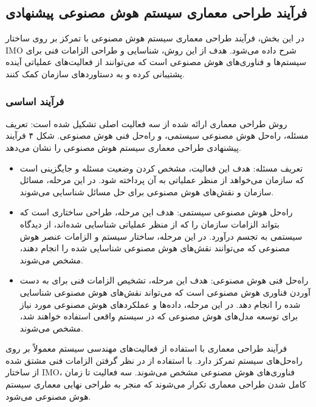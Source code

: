 \documentclass[a4paper,10pt]{article}
\begin{document}
        \subsection{فرآیند طراحی معماری سیستم هوش مصنوعی پیشنهادی}

            در این بخش، فرآیند طراحی معماری سیستم هوش مصنوعی با تمرکز بر روی ساختار IMO شرح داده می‌شود. هدف از این روش، شناسایی و طراحی الزامات فنی برای سیستم‌ها و فناوری‌های هوش مصنوعی است که می‌توانند از فعالیت‌های عملیاتی آینده پشتیبانی کرده و به دستاوردهای سازمان کمک کنند.

            \subsubsection{فرآیند اساسی}

                روش طراحی معماری ارائه شده از سه فعالیت اصلی تشکیل شده است: تعریف مسئله، راه‌حل هوش مصنوعی سیستمی، و راه‌حل فنی هوش مصنوعی. شکل ۴ فرآیند پیشنهادی طراحی معماری سیستم هوش مصنوعی را نشان می‌دهد.

                \begin{itemize}
                    
                    \item تعریف مسئله: هدف این فعالیت، مشخص کردن وضعیت مسئله و جایگزینی است که سازمان می‌خواهد از منظر عملیاتی به آن پرداخته شود. در این مرحله، مسائل سازمان و نقش‌های هوش مصنوعی برای حل مسائل شناسایی می‌شوند.

                    \item راه‌حل هوش مصنوعی سیستمی: هدف این مرحله، طراحی ساختاری است که بتواند الزامات سازمان را که از منظر عملیاتی شناسایی شده‌اند، از دیدگاه سیستمی به تجسم درآورد. در این مرحله، ساختار سیستم و الزامات عنصر هوش مصنوعی که می‌توانند نقش‌های هوش مصنوعی شناسایی شده را انجام دهند، مشخص می‌شوند.

                    \item راه‌حل فنی هوش مصنوعی: هدف این مرحله، تشخیص الزامات فنی برای به دست آوردن فناوری هوش مصنوعی است که می‌تواند نقش‌های هوش مصنوعی شناسایی شده را انجام دهد. در این مرحله، داده‌ها و عملکردهای هوش مصنوعی مورد نیاز برای توسعه مدل‌های هوش مصنوعی که در سیستم واقعی استفاده خواهند شد، مشخص می‌شوند.

                \end{itemize}

                فرآیند طراحی معماری با استفاده از فعالیت‌های مهندسی سیستم معمولاً بر روی راه‌حل‌های سیستم تمرکز دارد. با استفاده از در نظر گرفتن الزامات فنی مشتق شده از ساختار IMO، فناوری‌های هوش مصنوعی مشخص می‌شوند. سه فعالیت تا زمان کامل شدن طراحی معماری تکرار می‌شوند که منجر به طراحی نهایی معماری سیستم هوش مصنوعی می‌شود.
\end{document}
